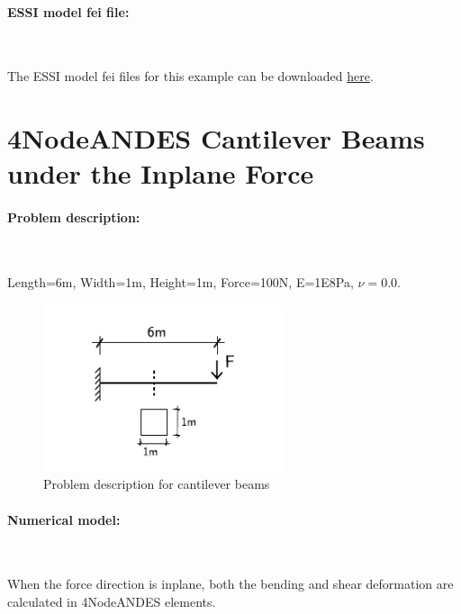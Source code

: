 \documentclass[fleqn,11pt]{article}
\begin{document}
\paragraph{ESSI model fei file: } ~



The ESSI model fei files for this example can be downloaded \href{https://github.com/yuan-energy/Real-ESSI-Examples/blob/master/model_fei_file/ANDESshell_cantilever_perpendicular_to_plane/ANDESshell_cantilever_perpendicular_to_plane.tgz?raw=true}{here}.








\newpage
\section{4NodeANDES Cantilever Beams under the Inplane Force}

\paragraph{Problem description:} ~

Length=6m, Width=1m, Height=1m, Force=100N, E=1E8Pa, $\nu=0.0$. 

\begin{figure}[H]
  \centering
  \includegraphics[width=7cm]{../Figure-files/cantilever_6.pdf}
  \caption{Problem description for cantilever beams}
  \label{fig Problem description for cantilever 4 2}
\end{figure}

\paragraph{Numerical model:} ~

When the force direction is inplane, both the bending and shear deformation are calculated in 4NodeANDES elements. 
\end{document}
